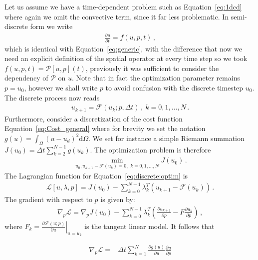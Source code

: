 \documentclass[10pt]{article}
\renewcommand{\d}{\mathrm{d}}
\newcommand{\dt}{\Delta t}
\newcommand{\CostFcn}{J}
\newcommand{\CostIntegrand}{g}
\newcommand{\param}{p}
\newcommand{\ModelN}{{\mathcal{F}}}
\newcommand{\ModelTLM}{F}
\newcommand{\Lagrangian}{{\mathcal{L}}}
\begin{document}
{Let us assume we have a time-dependent problem such as Equation~\ref{eq:1dcd} where again we omit the convective term, since it far less problematic. In semi-discrete form we write
%
\begin{align}
  \label{eq:semi:discrete:form}
\frac{\partial u}{\partial t} = f(u,p,t)\,, 
\end{align}
which is identical with Equation~\ref{eq:generic}, with the difference that now we need an explicit definition of the spatial operator at every time step so we took $f(u,p,t)=\mathcal P[u,p](t)$, previously it was sufficient to consider the dependency of $\mathcal P$ on $u$. Note that in fact the optimization parameter remains $\param=u_0$, however we shall write $p$ to avoid confusion with the discrete timestep $u_0$. 
The discrete process now reads
%
\begin{align}
   \label{eq:discrete:form}
u_{k+1} = \ModelN(u_{k};\param,\dt)\,,~ k=0,1,\dots, N\,.
\end{align}
%
Furthermore, consider a discretization of the cost function
Equation~\ref{eq:Cost_general} where for brevity we set the notation $g(u)=\int_{\Omega} (u-u_d)^2 \d \Omega$. We set for instance a simple Riemann summation
$\CostFcn(u_0) = \dt\sum_{k=2}^{N-1}  g(u_k)$. The optimization problem is therefore
%
\begin{align}
  \label{eq:discrete:optim}
\min_{u_0,u_{k+1} - \ModelN(u_{k})=0\,,~ k=0,1,\dots, N} \CostFcn(u_0)\,.
\end{align}
%
The Lagrangian function for Equation~\ref{eq:discrete:optim} is
%
\begin{align}
  \nonumber
\Lagrangian[u,\lambda,p] = \CostFcn(u_0) - \sum_{k=0}^{N-1} \lambda_k^T
\left(u_{k+1} - \ModelN(u_{k})\right)\,. 
\end{align}
%
The gradient with respect to $\param$ is given by:
%
\begin{align}
  \nonumber
\nabla_\param\Lagrangian =\nabla_\param \CostFcn(u_0) - \sum_{k=0}^{N-1}
\lambda_k^T \left(\frac{\partial u_{k+1}}{\partial \param} - \ModelTLM
\frac{\partial u_{k}}{\partial \param}\right)\,,
\end{align}
%
where $\ModelTLM_k = \left. \frac{\partial \ModelN(u;\param)}{\partial
  u}\right|_{u=u_k}$ is the tangent linear model. It follows that
%
\begin{allowdisplaybreaks}
\begin{align}
  \nonumber
  \nabla_\param
  \Lagrangian =&\dt \sum_{k=1}^{N} \left.
  \frac{\partial
  \CostIntegrand(u)}{\partial u}\frac{\partial u}{\partial \param}

\end{align}
\end{allowdisplaybreaks}}
\end{document}
